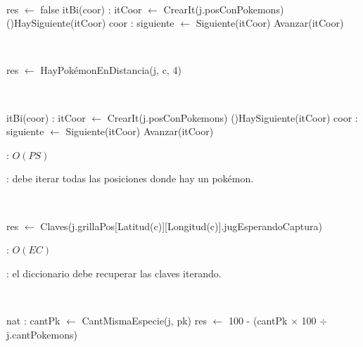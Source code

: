 \begin{Algoritmos}
	~

	\begin{algorithm}[H]
		\NoCaptionOfAlgo
		\caption{}
		res $\leftarrow$ false
		itBi(coor) : itCoor $\leftarrow$ CrearIt(j.posConPokemons)
		\While(){HaySiguiente(itCoor)}{
			coor : siguiente $\leftarrow$ Siguiente(itCoor)
			Avanzar(itCoor)
		}
	\end{algorithm}

	~

	\begin{algorithm}[H]
		\NoCaptionOfAlgo
		\caption{}
		res $\leftarrow$ HayPokémonEnDistancia(j, c, 4)
	\end{algorithm}

	~

	\begin{algorithm}[H]
		\NoCaptionOfAlgo
		\caption{}

		itBi(coor) : itCoor $\leftarrow$ CrearIt(j.posConPokemons)
		\While(){HaySiguiente(itCoor)}{
			coor : siguiente $\leftarrow$ Siguiente(itCoor)
			Avanzar(itCoor)
		}
	\end{algorithm}

	\complejidad: $O(PS)$

	\justifcomp: debe iterar todas las posiciones donde hay un pokémon.

	~

	\begin{algorithm}[H]
		\NoCaptionOfAlgo
		\caption{}
		res $\leftarrow$ Claves(j.grillaPos[Latitud(c)][Longitud(c)].jugEsperandoCaptura)
	\end{algorithm}

	\complejidad: $O(EC)$

	\justifcomp: el diccionario debe recuperar las claves iterando.

	~

	\begin{algorithm}[H]
		\NoCaptionOfAlgo
		\caption{}
		nat : cantPk $\leftarrow$ CantMismaEspecie(j, pk)
		res $\leftarrow$ 100 - (cantPk $\times$ 100 $\div$ j.cantPokemons)
	\end{algorithm}


\end{Algoritmos}
